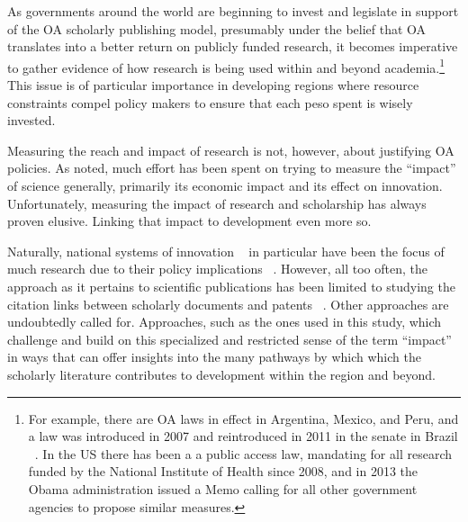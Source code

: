 As governments around the world are beginning to invest and legislate in support of the OA scholarly publishing model, presumably under the belief that OA translates into a better return on publicly funded research, it becomes imperative to gather evidence of how research is being used within and beyond academia.\footnote{For example, there are OA laws in effect in Argentina, Mexico, and Peru, and a law was introduced in 2007 and reintroduced in 2011 in the senate in Brazil ~\citep{UNESCO_GOAP_LATAM}. In the US there has been a a public access law, mandating for all research funded by the National Institute of Health since 2008, and in 2013 the Obama administration issued a Memo calling for all other government agencies to propose similar measures.} This issue is of particular importance in developing regions where resource constraints compel policy makers to ensure that each peso spent is wisely invested.

Measuring the reach and impact of research is not, however, about justifying OA policies. As noted, much effort has been spent on trying to measure the ``impact'' of science generally, primarily its economic impact and its effect on innovation. Unfortunately, measuring the impact of research and scholarship has always proven elusive. Linking that impact to development even more so.

Naturally, national systems of innovation ~\citep{Lundvall1988,Nelson1993} in particular have been the focus of much research due to their policy implications ~\citep{Nelson1982a,Irvine1984a,Leydesdorff2006}. However, all too often, the approach as it pertains to scientific publications has been limited to studying the citation links between scholarly documents and patents ~\citep[and for an overview, see Smith, 1998 and Chapter 1 of Moed, 2006]{Narin1997,Narin1998,Hicks2001,Balconi2004}. Other approaches are undoubtedly called for. Approaches, such as the ones used in this study, which challenge and build on this specialized and restricted sense of the term ``impact'' in ways that can offer insights into the many pathways by which which the scholarly literature contributes to development within the region and beyond.

